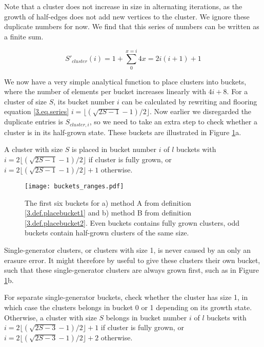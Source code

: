Note that a cluster does not increase in size in alternating iterations, as the growth of half-edges does not add new vertices to the cluster. We ignore these duplicate numbers for now. We find that this series of numbers can be written as a finite sum.

\begin{equation}\label{3.eq.series}
  S'_{cluster}(i) = 1 + \sum_{0}^{x=i} 4x = 2i(i+1) + 1
\end{equation}

We now have a very simple analytical function to place clusters into buckets, where the number of elements per bucket increases linearly with $4i + 8$. For a cluster of size $S$, its bucket number $i$ can be calculated by rewriting and flooring equation \ref{3.eq.series} $i=\lfloor (\sqrt{2S-1} - 1)/2 \rfloor$. Now earlier we disregarded the duplicate entries is $S_{cluster, i}$, so we need to take an extra step to check whether a cluster is in its half-grown state. These buckets are illustrated in Figure \ref{3.fig.bucketsranges}a.

\begin{definition}\label{3.def.placebucket1}
  A cluster with size $S$ is placed in bucket number $i$ of $l$ buckets with $i=2\lfloor (\sqrt{2S-1} - 1)/2 \rfloor$ if cluster is fully grown, or $i=2\lfloor (\sqrt{2S-1} - 1)/2 \rfloor + 1$ otherwise.
\end{definition}

\begin{figure}[h]
  \centering
  \texttt{[image: buckets\_ranges.pdf]}
  \caption{The first six buckets for a) method A from definition \ref{3.def.placebucket1} and b) method B from definition \ref{3.def.placebucket2}. Even buckets contains fully grown clusters, odd buckets contain half-grown clusters of the same size.}\label{3.fig.bucketsranges}
\end{figure}

Single-generator clusters, or clusters with size 1, is never caused by an only an erasure error. It might therefore by useful to give these clusters their own bucket, such that these single-generator clusters are always grown first, such as in Figure \ref{3.fig.bucketsranges}b.

\begin{definition}\label{3.def.placebucket2}
  For separate single-generator buckets, check whether the cluster has size 1, in which case the clusters belongs in bucket 0 or 1 depending on its growth state. Otherwise, a cluster with size $S$ belongs in bucket number $i$ of $l$ buckets with $i=2\lfloor (\sqrt{2S-3} - 1)/2 \rfloor + 1$ if cluster is fully grown, or $i=2\lfloor (\sqrt{2S-3} - 1)/2 \rfloor + 2$ otherwise.
\end{definition}

